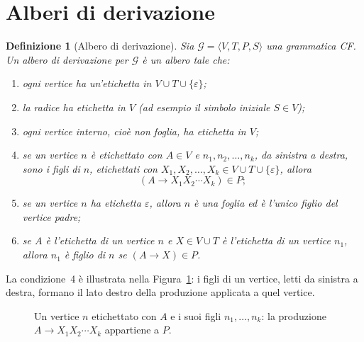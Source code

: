 \documentclass[a4paper, 11pt, oneside]{book}
\theoremstyle{formale}
\newtheorem*{definition}{Definizione}
\begin{document}
    \section{Alberi di derivazione}
    \begin{definition}[Albero di derivazione]
        Sia $\mathcal{G} = \langle V, T, P, S \rangle$ una grammatica CF. Un \emph{albero di
        derivazione} per $\mathcal{G}$ \`e un albero tale che:
        \begin{enumerate}
            \item ogni vertice ha un'etichetta in $V \cup T \cup \{\varepsilon\}$;
            \item la radice ha etichetta in $V$ (ad esempio il simbolo iniziale
                $S \in V$);
            \item ogni vertice interno, cio\`e non foglia, ha etichetta in $V$;
            \item se un vertice $n$ \`e etichettato con $A \in V$ e $n_1, n_2, \dots, n_k$,
                da sinistra a destra, sono i figli di $n$, etichettati con
                $X_1, X_2, \dots, X_k \in V \cup T \cup \{\varepsilon\}$, allora
                \begin{equation*}
                    (A \to X_1 X_2 \cdots X_k) \in P;
                \end{equation*}
            \item se un vertice $n$ ha etichetta $\varepsilon$, allora $n$ \`e una foglia ed
                \`e l'unico figlio del vertice padre;
            \item se $A$ \`e l'etichetta di un vertice $n$ e $X \in V \cup T$ \`e
                l'etichetta di un vertice $n_1$, allora $n_1$ \`e figlio di $n$ se
                $(A \to X) \in P$.
        \end{enumerate}
    \end{definition}
    La condizione~4 \`e illustrata nella Figura~\ref{fig:albero-vertice}: i figli di un
    vertice, letti da sinistra a destra, formano il lato destro della produzione applicata a
    quel vertice.

    \begin{figure}[H]
        \centering
        \caption{Un vertice $n$ etichettato con $A$ e i suoi figli $n_1, \dots, n_k$: la
            produzione $A \to X_1 X_2 \cdots X_k$ appartiene a $P$.}
        \label{fig:albero-vertice}
    \end{figure}
\end{document}
